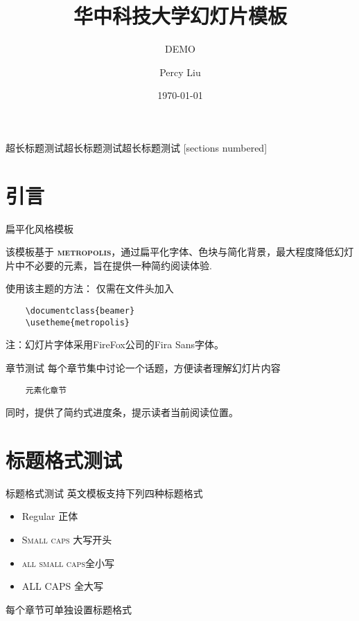 \documentclass[10pt]{beamer}
\title{华中科技大学幻灯片模板}
\subtitle{DEMO}
\date{\today}
\author{Percy Liu}
\institute{华中科技大学}
\newcommand{\themename}{\textbf{\textsc{metropolis}}\xspace}
\begin{document}
\maketitle

\begin{frame}{超长标题测试超长标题测试超长标题测试}
  [sections numbered]
  \tableofcontents[hideallsubsections]
\end{frame}

\section{引言}

\begin{frame}[fragile]{扁平化风格模板}

  该模板基于 \themename，通过扁平化字体、色块与简化背景，最大程度降低幻灯片中不必要的元素，旨在提供一种简约阅读体验.

  使用该主题的方法：
仅需在文件头加入
  \begin{verbatim}    \documentclass{beamer}
    \usetheme{metropolis}\end{verbatim}

  注：幻灯片字体采用FireFox公司的Fira Sans字体。
\end{frame}
\begin{frame}[fragile]{章节测试}
  每个章节集中讨论一个话题，方便读者理解幻灯片内容

  \begin{verbatim}    元素化章节 \end{verbatim}

  同时，提供了简约式进度条，提示读者当前阅读位置。
\end{frame}

\section{标题格式测试}

\begin{frame}{标题格式测试}
	英文模板支持下列四种标题格式
	\begin{itemize}
		\item Regular 正体
		\item \textsc{Small caps} 大写开头
		\item \textsc{all small caps}全小写
		\item ALL CAPS 全大写
	\end{itemize}
	每个章节可单独设置标题格式
\end{frame}
\end{document}
